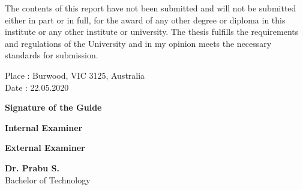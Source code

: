 \documentclass[12pt,a4paper]{article}
\begin{document}
The contents of this report have not been submitted and will not be submitted either in part or in full, for the award of any other degree or diploma in this institute or any other institute or university. The thesis fulfills the requirements and regulations of
the University and in my opinion meets the necessary standards for submission.

\noindent \begin{minipage}{0.45\linewidth}
\begin{flushleft}
\vspace{3 cm}
                         
Place  : Burwood, VIC 3125, Australia\\
Date  : 22.05.2020
\end{flushleft} 
\end{minipage}
\hfill
\begin{minipage}{0.45\linewidth}
\begin{flushright}                                      
\vspace{6 cm}
                   
\textbf{Signature of the Guide}\\
\end{flushright} 
\end{minipage}
\hfill
\noindent \begin{minipage}{0.45\linewidth}
\begin{flushleft}
\vspace{3 cm}

\textbf{Internal Examiner}
\end{flushleft} 
\end{minipage}
\hfill
\begin{minipage}{0.45\linewidth}
\begin{flushright}                                      
\vspace{3 cm}
                   
\textbf{External Examiner}\\
\end{flushright} 
\end{minipage}

\begin{center}
\vspace{1 cm}
\textbf{Dr. Prabu S.}\\
Bachelor of Technology\\
\end{center}


\thispagestyle{empty}
\end{document}
